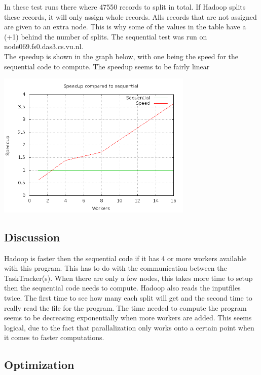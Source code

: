 \documentclass[a4paper]{article}
\begin{document}
    In these test runs there where 47550 records to split in total.
    If Hadoop splits these records, it will only assign whole records.
    Alls records that are not assigned are given to an extra node. This is why some of the values in the table
    have a (+1) behind the number of splits.
    The sequential test was run on node069.fs0.das3.cs.vu.nl.\\
    The speedup is shown in the graph below, with one being the
    speed for the sequential code to compute. The speedup seems to be fairly linear
    \begin{center}
      \includegraphics[width=0.7\textwidth]{speedup.png}
    \end{center}
  \subsection{Discussion}
    Hadoop is faster then the sequential code if it has 4 or more workers
    available with this program. This has to do with the communication
    between the TaskTracker(s). When there are only a few nodes,
    this takes more time to setup then the sequential code needs to compute.
    Hadoop also reads the inputfiles twice. The first time to see how many
    each split will get and the second time to really read the file for the program.
    The time needed to compute the program seems to be decreasing exponentially
    when more workers are added. This seems logical, due to the fact that
    parallalization only works onto a certain point when it comes to faster
    computations.
  \subsection{Optimization}
  
\end{document}
